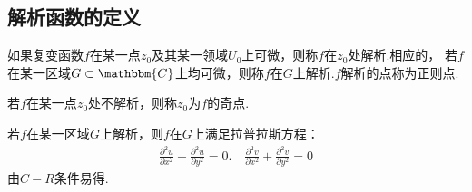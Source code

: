     \subsection{解析函数的定义}
        \begin{definition}[解析函数]\label{def:analytic_function}
            如果复变函数$f$在某一点$z_0$及其某一领域$U_0$上可微，则称$f$在$z_0$处解析.相应的，
            若$f$在某一区域$G \subset \mathbbm{C}$上均可微，则称$f$在$G$上解析.$f$解析的点称为正则点.
        \end{definition}
        \begin{definition}[奇点]\label{def:singular_point}
            若$f$在某一点$z_0$处不解析，则称$z_0$为$f$的奇点.
        \end{definition}
        \begin{theorem}[Laplace 方程]\label{the:Laplace_equation}
            若$f$在某一区域$G$上解析，则$f$在$G$上满足拉普拉斯方程：
            \begin{align*}
                \frac{\partial^2 u}{\partial x^2} + \frac{\partial^2 u}{\partial y^2} = 0. \quad \frac{\partial^2 v}{\partial x^2} + \frac{\partial^2 v}{\partial y^2} = 0
            \end{align*}
            由$C-R$条件易得.
        \end{theorem}

